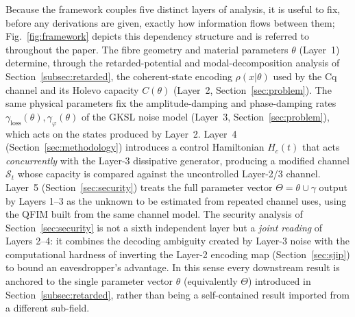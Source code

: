 \documentclass[journal,twocolumn]{IEEEtran}
\theoremstyle{definition}
\theoremstyle{plain}
\begin{document}
Because the framework couples five distinct layers of analysis, it
is useful to fix, before any derivations are given, exactly how
information flows between them; Fig.~\ref{fig:framework} depicts this
dependency structure and is referred to throughout the paper. The
fibre geometry and material parameters $\theta$ (Layer~1) determine,
through the retarded-potential and modal-decomposition analysis of
Section~\ref{subsec:retarded}, the coherent-state encoding
$\rho(x|\theta)$ used by the Cq channel and its Holevo capacity
$C(\theta)$ (Layer~2, Section~\ref{sec:problem}). The same physical
parameters fix the amplitude-damping and phase-damping rates
$\gamma_{\mathrm{loss}}(\theta),\gamma_\varphi(\theta)$ of the GKSL
noise model (Layer~3, Section~\ref{sec:problem}), which acts on the
states produced by Layer~2. Layer~4 (Section~\ref{sec:methodology})
introduces a control Hamiltonian $H_c(t)$ that acts \emph{concurrently}
with the Layer-3 dissipative generator, producing a modified channel
$\mathcal{S}_t$ whose capacity is compared against the uncontrolled
Layer-2/3 channel. Layer~5 (Section~\ref{sec:security}) treats the
full parameter vector $\Theta=\theta\cup\gamma$ output by Layers 1--3
as the unknown to be estimated from repeated channel uses, using the
QFIM built from the same channel model. The security analysis of
Section~\ref{sec:security} is not a sixth independent layer but a
\emph{joint reading} of Layers 2--4: it combines the decoding
ambiguity created by Layer-3 noise with the computational hardness of
inverting the Layer-2 encoding map (Section~\ref{sec:sjip}) to bound
an eavesdropper's advantage. In this sense every downstream result
is anchored to the single parameter vector $\theta$ (equivalently
$\Theta$) introduced in Section~\ref{subsec:retarded}, rather than
being a self-contained result imported from a different sub-field.
\end{document}
